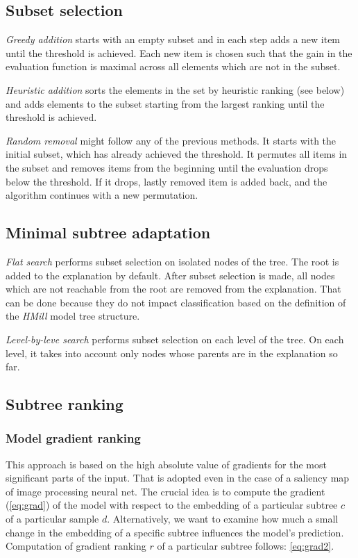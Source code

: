 \subsection{Subset selection}
\emph{Greedy addition} starts with an empty subset and in each step adds a new item until the threshold is achieved. Each new item is chosen such that the gain in the evaluation function is maximal across all elements which are not in the subset.

\emph{Heuristic addition} sorts the elements in the set by heuristic ranking (see below) and adds elements to the subset starting from the largest ranking until the threshold is achieved.

\emph{Random removal} might follow any of the previous methods. It starts with the initial subset, which has already achieved the threshold. It permutes all items in the subset and removes items from the beginning until the evaluation drops below the threshold. If it drops, lastly removed item is added back, and the algorithm continues with a new permutation.
\subsection{Minimal subtree adaptation}
\emph{Flat search} performs subset selection on isolated nodes of the tree. The root is added to the explanation by default. After subset selection is made, all nodes which are not reachable from the root are removed from the explanation. That can be done because they do not impact classification based on the definition of the \emph{HMill} model tree structure.

\emph{Level-by-leve search} performs subset selection on each level of the tree. On each level, it takes into account only nodes whose parents are in the explanation so far.

\subsection{Subtree ranking}
\subsubsection{Model gradient ranking}
This approach is based on the high absolute value of gradients for the most significant parts of the input. That is adopted even in the case of a saliency map of image processing neural net. The crucial idea is to compute the gradient (\ref{eq:grad}) of the model with respect to the embedding of a particular subtree $c$ of a particular sample $d$. Alternatively, we want to examine how much a small change in the embedding of a specific subtree influences the model's prediction. Computation of gradient ranking $r$ of a particular subtree follows: \ref{eq:grad2}.

